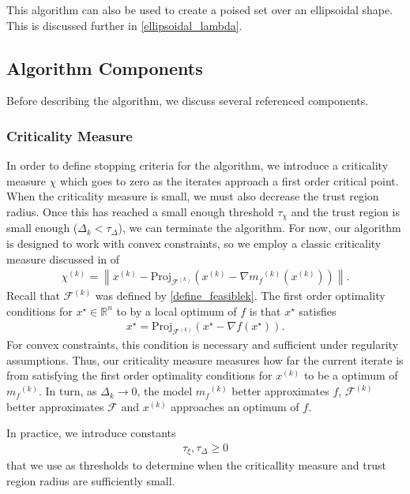 \documentclass{article}
\theoremstyle{case}
\numberwithin{theorem}{subsection}
\newcommand{\chik}{{\chi^{(k)}}}
\newcommand{\dk}{\Delta_k}
\newcommand{\feasiblek}{{\mathcal F^{(k)}}}
\newcommand{\feasible}{{\mathcal F}}
\newcommand{\gradf}{\nabla f}
\newcommand{\mfk}{{{m}_f}^{(k)}}
\newcommand{\Rn}{\mathbb R^n}
\newcommand{\tolcrit}{\tau_{\xi}}
\newcommand{\tolrad}{\tau_{\Delta}}
\newcommand{\xk}{x^{(k)}}
\begin{document}
This algorithm can also be used to create a poised set over an ellipsoidal shape.
This is discussed further in \cref{ellipsoidal_lambda}.



\subsection{Algorithm Components}

Before describing the algorithm, we discuss several referenced components.

\subsubsection{Criticality Measure}

In order to define stopping criteria for the algorithm, we introduce a criticality measure $\chi$ which goes to zero as the iterates approach a first order critical point.
When the criticality measure is small, we must also decrease the trust region radius.
Once this has reached a small enough threshold $\tau_{\chi}$ and the trust region is small enough ($\Delta_k < \tau_{\Delta}$), we can terminate the algorithm.
For now, our algorithm is designed to work with convex constraints, so we employ a classic criticality measure discussed in \cite{ConnGoulToin00} of
\begin{align}
\label{define_criticality_measure}
\chik = \left\|\xk - \text{Proj}_{\feasiblek}\left(\xk- \nabla \mfk\left(\xk\right)\right)\right\|.
\end{align}
Recall that $\feasiblek$ was defined by \cref{define_feasiblek}.
The first order optimality conditions for $x^{\star} \in \Rn$ to by a local optimum of $f$ is that $x^{\star}$ satisfies
\begin{align*}
x^{\star} = \text{Proj}_{\feasiblek}\left(x^{\star} - \gradf(x^{\star})\right).
\end{align*}
For convex constraints, this condition is necessary and sufficient under regularity assumptions.
Thus, our criticality measure measures how far the current iterate is from satisfying the first order optimality conditions for $\xk$ to be a optimum of $\mfk$.
In turn, as $\dk \to 0$, the model $\mfk$ better approximates $f$, $\feasiblek$ better approximates $\feasible$ and $\xk$ approaches an optimum of $f$.

In practice, we introduce constants 
\begin{align}
            \tolcrit, \tolrad \ge 0 \label{define_algorithm_tolerances}
\end{align}
that we use as thresholds to determine when the criticallity measure and trust region radius are sufficiently small.
\end{document}
